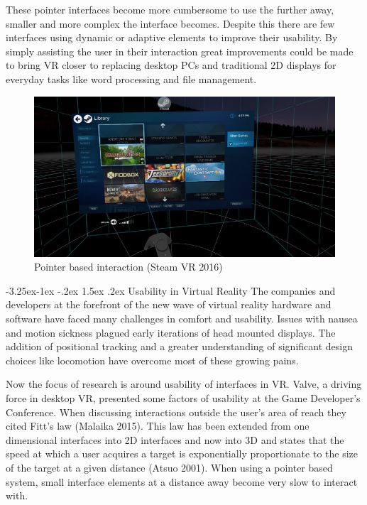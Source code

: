\documentclass[12pt]{article}
\makeatletter
\renewcommand{\subsection}{\@startsection{subsection}{2}{\z@}%
             {-3.25ex\@plus -1ex \@minus -.2ex}%
             {1.5ex \@plus .2ex}%
             {\normalfont\large\scshape\bfseries}}
\makeatother
\begin{document}
These pointer interfaces become more cumbersome to use the further away, smaller and more complex the interface becomes. Despite this there are few interfaces using dynamic or adaptive elements to improve their usability. By simply assisting the user in their interaction great improvements could be made to bring VR closer to replacing desktop PCs and traditional 2D displays for everyday tasks like word processing and file management.

\begin{figure}
\centering
  \includegraphics[width=.8\linewidth]{steamvr.jpg}
  \caption{Pointer based interaction (Steam VR 2016)}
\end{figure}

\subsection{Usability in Virtual Reality}
The companies and developers at the forefront of the new wave of virtual reality hardware and software have faced many challenges in comfort and usability. Issues with nausea and motion sickness plagued early iterations of head mounted displays. The addition of positional tracking and a greater understanding of significant design choices like locomotion have overcome most of these growing pains.

Now the focus of research is around usability of interfaces in VR. Valve, a driving force in desktop VR, presented some factors of usability at the Game Developer's Conference. When discussing interactions outside the user's area of reach they cited Fitt's law (Malaika 2015). This law has been extended from one dimensional interfaces into 2D interfaces and now into 3D and states that the speed at which a user acquires a target is exponentially proportionate to the size of the target at a given distance (Atsuo 2001). When using a pointer based system, small interface elements at a distance away become very slow to interact with. 
\end{document}
